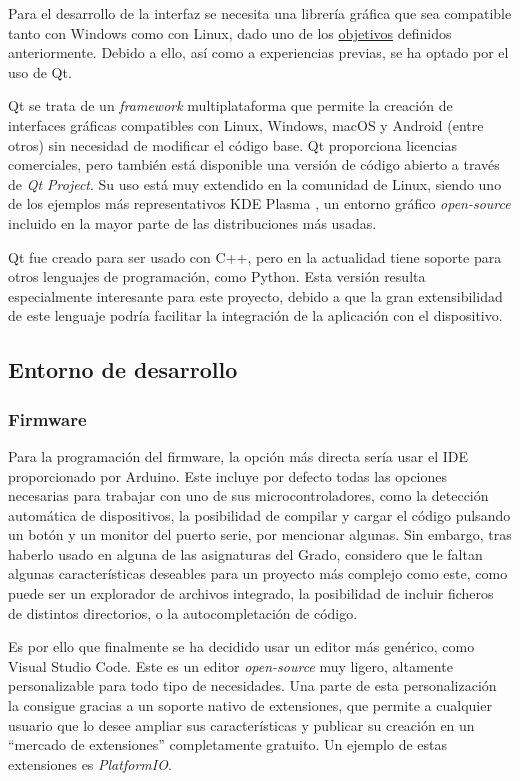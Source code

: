 Para el desarrollo de la interfaz se necesita una librería gráfica que sea compatible tanto con Windows como con Linux, dado uno de los \hyperref[sec:objetivos]{objetivos} definidos anteriormente. Debido a ello, así como a experiencias previas, se ha optado por el uso de Qt.

Qt se trata de un \textit{framework} multiplataforma que permite la creación de interfaces gráficas compatibles con Linux, Windows, macOS y Android (entre otros) sin necesidad de modificar el código base. Qt proporciona licencias comerciales, pero también está disponible una versión de código abierto a través de \textit{Qt Project}. Su uso está muy extendido en la comunidad de Linux, siendo uno de los ejemplos más representativos KDE Plasma \cite{kde-plasma}, un entorno gráfico \textit{open-source} incluido en la mayor parte de las distribuciones más usadas.

Qt fue creado para ser usado con C++, pero en la actualidad tiene soporte para otros lenguajes de programación, como Python. Esta versión resulta especialmente interesante para este proyecto, debido a que la gran extensibilidad de este lenguaje podría facilitar la integración de la aplicación con el dispositivo.

\subsection{Entorno de desarrollo}

\subsubsection{Firmware}

Para la programación del firmware, la opción más directa sería usar el IDE proporcionado por Arduino. Este incluye por defecto todas las opciones necesarias para trabajar con uno de sus microcontroladores, como la detección automática de dispositivos, la posibilidad de compilar y cargar el código pulsando un botón y un monitor del puerto serie, por mencionar algunas. Sin embargo, tras haberlo usado en alguna de las asignaturas del Grado, considero que le faltan algunas características deseables para un proyecto más complejo como este, como puede ser un explorador de archivos integrado, la posibilidad de incluir ficheros de distintos directorios, o la autocompletación de código.

Es por ello que finalmente se ha decidido usar un editor más genérico, como Visual Studio Code. Este es un editor \textit{open-source} muy ligero, altamente personalizable para todo tipo de necesidades. Una parte de esta personalización la consigue gracias a un soporte nativo de extensiones, que permite a cualquier usuario que lo desee ampliar sus características y publicar su creación en un ``mercado de extensiones'' completamente gratuito. Un ejemplo de estas extensiones es \textit{PlatformIO}.

